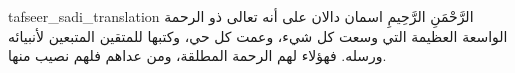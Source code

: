 \begin{taggedblock}{tafseer_sadi_translation}
{الرَّحْمَنِ الرَّحِيمِ}
اسمان دالان على أنه تعالى ذو الرحمة الواسعة العظيمة التي وسعت كل شيء، وعمت كل حي، وكتبها للمتقين المتبعين لأنبيائه ورسله. فهؤلاء لهم الرحمة المطلقة، ومن عداهم فلهم نصيب منها.
\end{taggedblock}

\begin{comment}
Please use the following for footnotes:- Sample\footnoteQ{Text of Qur'an footnote goes here.}.
Sample\footnoteT{Text of Tafseer footnote goes here.}.
\end{comment}